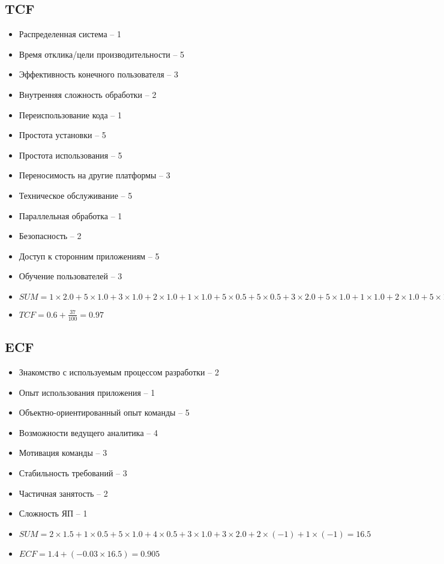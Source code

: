 \documentclass[a4paper,8pt]{article}
\begin{document}
\subsection*{TCF}
\begin{itemize}
    \item Распределенная система -- 1
\item Время отклика/цели производительности  -- 5
\item Эффективность конечного пользователя -- 3
\item Внутренняя сложность обработки -- 2
\item Переиспользование кода -- 1 
\item Простота установки -- 5
\item Простота использования -- 5
\item Переносимость на другие платформы -- 3
\item Техническое обслуживание -- 5
\item Параллельная обработка  -- 1
\item Безопасность -- 2
\item Доступ к сторонним приложениям  -- 5
\item Обучение пользователей -- 3
\item $SUM = 1\times2.0 + 5\times1.0 + 3\times1.0 + 2\times1.0 + 1\times1.0 + 5\times0.5 + 5\times0.5 + 3\times2.0 + 5\times1.0 + 1\times1.0 + 2\times1.0 + 5\times1.0 + 3\times1.0 = 37$
\item $TCF =  0.6 + \frac{37}{100} = 0.97$
\end{itemize}

\subsection*{ECF}
    \begin{itemize}
    \item Знакомство с используемым процессом разработки -- 2
    \item Опыт использования приложения -- 1
    \item Объектно-ориентированный опыт команды -- 5
    \item Возможности ведущего аналитика -- 4
    \item Мотивация команды -- 3
    \item Стабильность требований -- 3
    \item Частичная занятость -- 2
    \item Сложность ЯП -- 1
    \item $SUM = 2 \times 1.5 + 1\times0.5 + 5\times1.0 + 4\times0.5 + 3\times1.0 + 3\times2.0 + 2\times(-1) + 1\times(-1) = 16.5$
    \item $ECF = 1.4 + (-0.03 \times 16.5) = 0.905$
\end{itemize}
\end{document}
